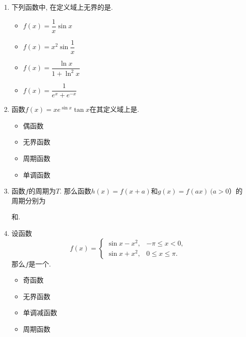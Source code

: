 \documentclass[a4paper,punct=CCT]{ctexbook}
\theoremstyle{break}
\newif\ifshowsol
\let\leq\leqslant
\let\le\leq
\begin{document}
\begin{enumerate}
\item 下列函数中, 在定义域上无界的是\uline{\makebox[4em]{}}.
  \begin{itemize}
    \renewcommand{\labelitemi}{\faCircleThin}
  \item \(f(x) = \dfrac1x \sin x\)
    \ifshowsol
  \item[\faCircle] \(f(x) = x^2 \sin \dfrac1x\)
    \else
  \item \(f(x) = x^2 \sin \dfrac1x\)
    \fi
  \item \(f(x) = \dfrac{\ln x}{1 + \ln^2 x}\)
  \item \(f(x) = \dfrac1{e^x + e^{-x}}\)
  \end{itemize}

\item 函数\(f(x) = x e^{\sin x} \tan x\)在其定义域上是\uline{\makebox[3em]{}}.
  \begin{itemize}
    \renewcommand{\labelitemi}{\faCircleThin}
  \item 偶函数
    \ifshowsol
  \item[\faCircle] 无界函数
    \else
  \item 无界函数
    \fi
  \item 周期函数
  \item 单调函数
  \end{itemize}

\item 函数\(f\)的周期为\(T\).  那么函数\(h(x) = f(x+a)\)和\(g(x) = f(ax)\ (a > 0）\)的周期分别为
  \ifshowsol
  \uline{\makebox[3em]{\(T\)}}和\uline{\makebox[3em]{\(T/a\)}}.
  \else
  \uline{\makebox[3em]{}}和\uline{\makebox[3em]{}}.
  \fi

\item 设函数
  \[
    f(x) =
    \begin{cases}
      \sin x - x^2, & -\pi \le x < 0, \\
      \sin x + x^2, & 0 \le x \le \pi.
    \end{cases}
  \]
  那么\(f\)是一个\uline{\makebox[4em]{}}.
  \begin{itemize}
    \renewcommand{\labelitemi}{\faCircleThin}
    \ifshowsol
  \item[\faCircle] 奇函数
    \else
  \item 奇函数
    \fi
  \item 无界函数
  \item 单调减函数
  \item 周期函数
  \end{itemize}


\end{enumerate}
\end{document}
